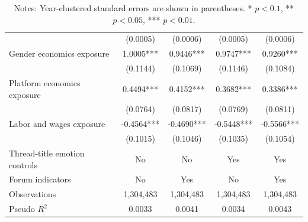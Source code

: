 \documentclass[11pt]{article}
\begin{document}
\begin{table}[!htbp]
{\begin{tabular}{lcccc}
         & (0.0005) & (0.0006) & (0.0005) & (0.0006) \\
        Gender economics exposure & 1.0005*** & 0.9446*** & 0.9747*** & 0.9260*** \\
         & (0.1144) & (0.1069) & (0.1146) & (0.1084) \\
        Platform economics exposure & 0.4494*** & 0.4152*** & 0.3682*** & 0.3386*** \\
         & (0.0764) & (0.0817) & (0.0769) & (0.0811) \\
        Labor and wages exposure & -0.4564*** & -0.4690*** & -0.5448*** & -0.5566*** \\
         & (0.1015) & (0.1046) & (0.1035) & (0.1054) \\
        \midrule
        Thread-title emotion controls & No & No & Yes & Yes \\
        Forum indicators & No & Yes & No & Yes \\
        Observations & 1,304,483 & 1,304,483 & 1,304,483 & 1,304,483 \\
        Pseudo $R^2$ & 0.0033 & 0.0041 & 0.0034 & 0.0043 \\
        \bottomrule
    \end{tabular}}
    {\captionsetup{justification=raggedright,singlelinecheck=false}
    \caption*{\footnotesize Notes: Year-clustered standard errors are shown in parentheses. * \(p<0.1\), ** \(p<0.05\), *** \(p<0.01\).}}
\end{table}
\end{document}
